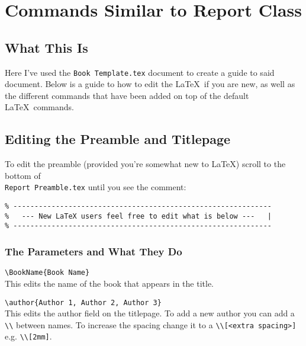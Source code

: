 \documentclass[Book Template.tex]{subfiles}
\begin{document}
    \chapter{Commands Similar to Report Class}
        \label{ch: Commands Shared with Report}
        \thispagestyle{noheader}

        \section{What This Is}
            \label{sec: what this is}
            
            Here I've used the \verb+Book Template.tex+ document to create a guide to said document. Below is a guide to how to edit the \LaTeX~if you are new, as well as the different commands that have been added on top of the default \LaTeX~commands.
        

        \section{Editing the Preamble and Titlepage}
            \label{sec: editing the preamble}

            To edit the preamble (provided you're somewhat new to \LaTeX) scroll to the bottom of \\\verb+Report Preamble.tex+ until you see the comment:

            \begin{lstlisting}
% -------------------------------------------------------------
%   --- New LaTeX users feel free to edit what is below ---   |
% -------------------------------------------------------------
            \end{lstlisting}



            \subsection{The Parameters and What They Do}
                \label{subsec: the parameters and what they do}

                \verb+\BookName{Book Name}+\\
                This edits the name of the book that appears in the title.

                \verb+\author{Author 1, Author 2, Author 3}+\\
                This edits the author field on the titlepage. To add a new author you can add a \verb+\\+ between names. To increase the spacing change it to a \verb+\\[<extra spacing>]+ e.g. \verb+\\[2mm]+.
\end{document}
